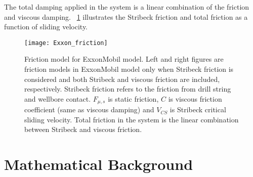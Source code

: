 The total damping applied in the system is a linear combination of the friction and viscous damping. \figurename~\ref{figure_Exxon_friction} illustrates the Stribeck friction and total friction as a function of sliding velocity.
\begin{figure}
	\centering
	\texttt{[image: Exxon\_friction]}
    \caption[Friction model for ExxonMobil model]{Friction model for ExxonMobil model. Left and right figures are friction models in ExxonMobil model only when Stribeck friction is considered and both Stribeck and viscous friction are included, respectively. Stribeck friction refers to the friction from drill string and wellbore contact. $F_{\mu, s}$ is static friction, $C$ is viscous friction coefficient (same as viscous damping) and $V_{CS}$ is Stribeck critical sliding velocity. Total friction in the system is the linear combination between Stribeck and viscous friction. }\label{figure_Exxon_friction}
\end{figure}



\section{Mathematical Background}

